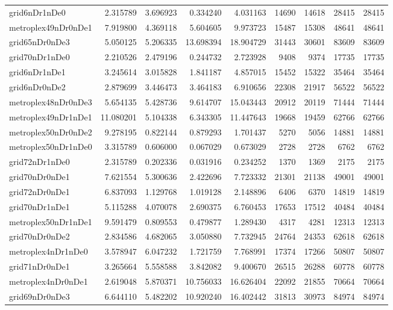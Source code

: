 \begin{longtable}{|l|r|r|r|r|r|r|r|r|}
grid6nDr1nDe0 & 2.315789 & 3.696923 & 0.334240 & 4.031163 & 14690 & 14618 & 28415 & 28415 \\
metroplex49nDr0nDe1 & 7.919800 & 4.369118 & 5.604605 & 9.973723 & 15487 & 15308 & 48641 & 48641 \\
grid65nDr0nDe3 & 5.050125 & 5.206335 & 13.698394 & 18.904729 & 31443 & 30601 & 83609 & 83609 \\
grid70nDr1nDe0 & 2.210526 & 2.479196 & 0.244732 & 2.723928 & 9408 & 9374 & 17735 & 17735 \\
grid6nDr1nDe1 & 3.245614 & 3.015828 & 1.841187 & 4.857015 & 15452 & 15322 & 35464 & 35464 \\
grid6nDr0nDe2 & 2.879699 & 3.446473 & 3.464183 & 6.910656 & 22308 & 21917 & 56522 & 56522 \\
metroplex48nDr0nDe3 & 5.654135 & 5.428736 & 9.614707 & 15.043443 & 20912 & 20119 & 71444 & 71444 \\
metroplex49nDr1nDe1 & 11.080201 & 5.104338 & 6.343305 & 11.447643 & 19668 & 19459 & 62766 & 62766 \\
metroplex50nDr0nDe2 & 9.278195 & 0.822144 & 0.879293 & 1.701437 & 5270 & 5056 & 14881 & 14881 \\
metroplex50nDr1nDe0 & 3.315789 & 0.606000 & 0.067029 & 0.673029 & 2728 & 2728 & 6762 & 6762 \\
grid72nDr1nDe0 & 2.315789 & 0.202336 & 0.031916 & 0.234252 & 1370 & 1369 & 2175 & 2175 \\
grid70nDr0nDe1 & 7.621554 & 5.300636 & 2.422696 & 7.723332 & 21301 & 21138 & 49001 & 49001 \\
grid72nDr0nDe1 & 6.837093 & 1.129768 & 1.019128 & 2.148896 & 6406 & 6370 & 14819 & 14819 \\
grid70nDr1nDe1 & 5.115288 & 4.070078 & 2.690375 & 6.760453 & 17653 & 17512 & 40484 & 40484 \\
metroplex50nDr1nDe1 & 9.591479 & 0.809553 & 0.479877 & 1.289430 & 4317 & 4281 & 12313 & 12313 \\
grid70nDr0nDe2 & 2.834586 & 4.682065 & 3.050880 & 7.732945 & 24764 & 24353 & 62618 & 62618 \\
metroplex4nDr1nDe0 & 3.578947 & 6.047232 & 1.721759 & 7.768991 & 17374 & 17266 & 50807 & 50807 \\
grid71nDr0nDe1 & 3.265664 & 5.558588 & 3.842082 & 9.400670 & 26515 & 26288 & 60778 & 60778 \\
metroplex4nDr0nDe1 & 2.619048 & 5.870371 & 10.756033 & 16.626404 & 22092 & 21855 & 70664 & 70664 \\
grid69nDr0nDe3 & 6.644110 & 5.482202 & 10.920240 & 16.402442 & 31813 & 30973 & 84974 & 84974 \\

\end{longtable}
